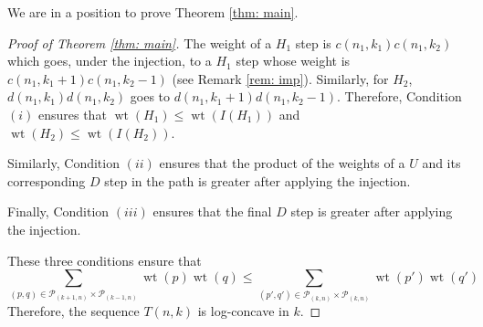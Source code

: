\documentclass{article}
\newcommand{\lp}{\mathcal{P}}
\DeclareMathOperator{\wt}{wt}
\newtheorem{theorem}{Theorem}[section]
\theoremstyle{definition}
\numberwithin{equation}{section}
\begin{document}
We are in a position to prove Theorem \ref{thm: main}.
\begin{proof}[Proof of Theorem \ref{thm: main}]
The weight of a $H_1$ step is $c(n_1,k_1)c(n_1,k_2)$ which goes, under the injection, to a $H_1$ step whose weight is $c(n_1,k_1+1)c(n_1,k_2-1)$ (see Remark \ref{rem: imp}). Similarly, for $H_2$, $d(n_1,k_1)d(n_1,k_2)$ goes to $d(n_1,k_1+1)d(n_1,k_2-1)$. Therefore, Condition $(i)$ ensures that $\wt(H_1)\le \wt(I(H_1))$ and $\wt(H_2)\le \wt(I(H_2))$.

Similarly, Condition $(ii)$ ensures that the product of the weights of a $U$ and its corresponding $D$ step in the path is greater after applying the injection. 

Finally, Condition $(iii)$ ensures that the final $D$ step is greater after applying the injection.

These three conditions ensure that 
\begin{equation*}
    \displaystyle \sum_{(p,q)\in \lp_{(k+1,n)}\times \lp_{(k-1,n)}} \wt(p)\wt(q) \le \displaystyle \sum_{(p',q')\in \lp_{(k,n)}\times \lp_{(k,n)}} \wt(p')\wt(q')
\end{equation*}
Therefore, the sequence $T(n,k)$ is log-concave in $k$.
\end{proof}
\end{document}
